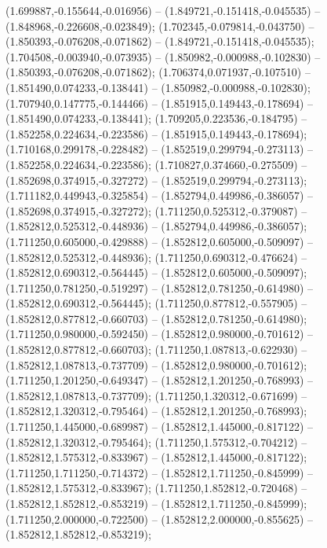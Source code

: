  (1.699887,-0.155644,-0.016956) -- (1.849721,-0.151418,-0.045535) -- (1.848968,-0.226608,-0.023849);
 (1.702345,-0.079814,-0.043750) -- (1.850393,-0.076208,-0.071862) -- (1.849721,-0.151418,-0.045535);
 (1.704508,-0.003940,-0.073935) -- (1.850982,-0.000988,-0.102830) -- (1.850393,-0.076208,-0.071862);
 (1.706374,0.071937,-0.107510) -- (1.851490,0.074233,-0.138441) -- (1.850982,-0.000988,-0.102830);
 (1.707940,0.147775,-0.144466) -- (1.851915,0.149443,-0.178694) -- (1.851490,0.074233,-0.138441);
 (1.709205,0.223536,-0.184795) -- (1.852258,0.224634,-0.223586) -- (1.851915,0.149443,-0.178694);
 (1.710168,0.299178,-0.228482) -- (1.852519,0.299794,-0.273113) -- (1.852258,0.224634,-0.223586);
 (1.710827,0.374660,-0.275509) -- (1.852698,0.374915,-0.327272) -- (1.852519,0.299794,-0.273113);
 (1.711182,0.449943,-0.325854) -- (1.852794,0.449986,-0.386057) -- (1.852698,0.374915,-0.327272);
 (1.711250,0.525312,-0.379087) -- (1.852812,0.525312,-0.448936) -- (1.852794,0.449986,-0.386057);
 (1.711250,0.605000,-0.429888) -- (1.852812,0.605000,-0.509097) -- (1.852812,0.525312,-0.448936);
 (1.711250,0.690312,-0.476624) -- (1.852812,0.690312,-0.564445) -- (1.852812,0.605000,-0.509097);
 (1.711250,0.781250,-0.519297) -- (1.852812,0.781250,-0.614980) -- (1.852812,0.690312,-0.564445);
 (1.711250,0.877812,-0.557905) -- (1.852812,0.877812,-0.660703) -- (1.852812,0.781250,-0.614980);
 (1.711250,0.980000,-0.592450) -- (1.852812,0.980000,-0.701612) -- (1.852812,0.877812,-0.660703);
 (1.711250,1.087813,-0.622930) -- (1.852812,1.087813,-0.737709) -- (1.852812,0.980000,-0.701612);
 (1.711250,1.201250,-0.649347) -- (1.852812,1.201250,-0.768993) -- (1.852812,1.087813,-0.737709);
 (1.711250,1.320312,-0.671699) -- (1.852812,1.320312,-0.795464) -- (1.852812,1.201250,-0.768993);
 (1.711250,1.445000,-0.689987) -- (1.852812,1.445000,-0.817122) -- (1.852812,1.320312,-0.795464);
 (1.711250,1.575312,-0.704212) -- (1.852812,1.575312,-0.833967) -- (1.852812,1.445000,-0.817122);
 (1.711250,1.711250,-0.714372) -- (1.852812,1.711250,-0.845999) -- (1.852812,1.575312,-0.833967);
 (1.711250,1.852812,-0.720468) -- (1.852812,1.852812,-0.853219) -- (1.852812,1.711250,-0.845999);
 (1.711250,2.000000,-0.722500) -- (1.852812,2.000000,-0.855625) -- (1.852812,1.852812,-0.853219);
